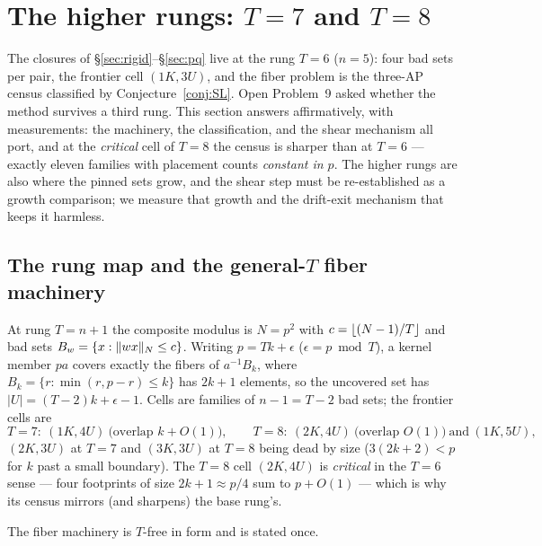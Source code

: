 
\section{The higher rungs: $T=7$ and $T=8$}\label{sec:higherrung}

The closures of \S\ref{sec:rigid}--\S\ref{sec:pq} live at the rung $T=6$
($n=5$): four bad sets per pair, the frontier cell $(1K,3U)$, and the
fiber problem is the three-AP census classified by Conjecture~\ref{conj:SL}.
Open Problem~9 asked whether the method survives a third rung. This
section answers affirmatively, with measurements: the machinery, the
classification, and the shear mechanism all port, and at the \emph{critical}
cell of $T=8$ the census is sharper than at $T=6$ --- exactly eleven
families with placement counts \emph{constant in $p$}. The higher rungs
are also where the pinned sets grow, and the shear step must be
re-established as a growth comparison; we measure that growth and the
drift-exit mechanism that keeps it harmless.

\subsection{The rung map and the general-\texorpdfstring{$T$}{T} fiber machinery}

At rung $T=n+1$ the composite modulus is $N=p^2$ with $c=\left\lfloor (N-1)/T \right\rfloor$
and bad sets $B_w=\{x:\lVert wx \rVert_{N}\le c\}$. Writing $p=Tk+\epsilon$
($\epsilon=p\bmod T$), a kernel member $pa$ covers exactly the fibers of
$a^{-1}B_k$, where $B_k=\{r:\min(r,p-r)\le k\}$ has $2k+1$ elements, so
the uncovered set has $|U|=(T-2)k+\epsilon-1$. Cells are families of
$n-1=T-2$ bad sets; the frontier cells are
\[
T=7:\ (1K,4U)\ \text{(overlap }k+O(1)\text{)},\qquad
T=8:\ (2K,4U)\ \text{(overlap }O(1)\text{)}\ \text{and}\ (1K,5U),
\]
$(2K,3U)$ at $T=7$ and $(3K,3U)$ at $T=8$ being dead by size
($3(2k+2)<p$ for $k$ past a small boundary). The $T=8$ cell $(2K,4U)$ is
\emph{critical} in the $T=6$ sense --- four footprints of size
$2k+1\approx p/4$ sum to $p+O(1)$ --- which is why its census mirrors
(and sharpens) the base rung's.

The fiber machinery is $T$-free in form and is stated once.

